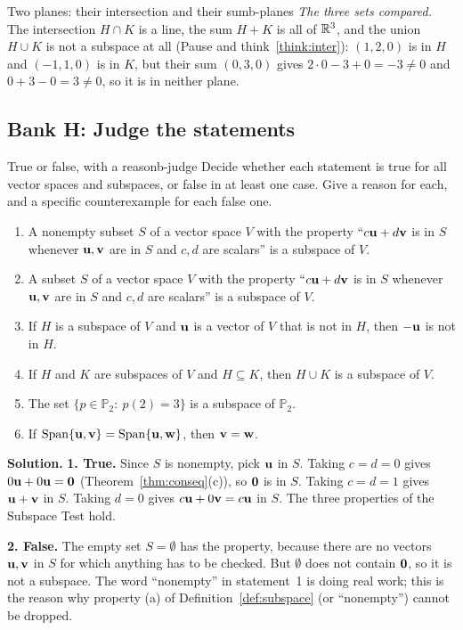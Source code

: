 \documentclass[11pt]{article}
\begin{document}
\begin{exmp}{Two planes: their intersection and their sum}{b-planes}
\emph{The three sets compared.} The intersection $H\cap K$ is a line, the sum $H+K$ is all of $\mathbb{R}^3$, and the union $H\cup K$ is not a subspace at all (Pause and think~\ref{think:inter}): $(1,2,0)$ is in $H$ and $(-1,1,0)$ is in $K$, but their sum $(0,3,0)$ gives $2\cdot0-3+0=-3\neq0$ and $0+3-0=3\neq0$, so it is in neither plane.
\end{exmp}

\subsection*{Bank H: Judge the statements}

\begin{exmp}{True or false, with a reason}{b-judge}
Decide whether each statement is true for all vector spaces and subspaces, or false in at least one case. Give a reason for each, and a specific counterexample for each false one.
\begin{enumerate}
  \item A nonempty subset $S$ of a vector space $V$ with the property ``$c\mathbf{u}+d\mathbf{v}$ is in $S$ whenever $\mathbf{u},\mathbf{v}$ are in $S$ and $c,d$ are scalars'' is a subspace of $V$.
  \item A subset $S$ of a vector space $V$ with the property ``$c\mathbf{u}+d\mathbf{v}$ is in $S$ whenever $\mathbf{u},\mathbf{v}$ are in $S$ and $c,d$ are scalars'' is a subspace of $V$.
  \item If $H$ is a subspace of $V$ and $\mathbf{u}$ is a vector of $V$ that is not in $H$, then $-\mathbf{u}$ is not in $H$.
  \item If $H$ and $K$ are subspaces of $V$ and $H\subseteq K$, then $H\cup K$ is a subspace of $V$.
  \item The set $\{p\in\mathbb{P}_2:\ p(2)=3\}$ is a subspace of $\mathbb{P}_2$.
  \item If $\operatorname{Span}\{\mathbf{u},\mathbf{v}\}=\operatorname{Span}\{\mathbf{u},\mathbf{w}\}$, then $\mathbf{v}=\mathbf{w}$.
\end{enumerate}

\textbf{Solution.} \textbf{1. True.} Since $S$ is nonempty, pick $\mathbf{u}$ in $S$. Taking $c=d=0$ gives $0\mathbf{u}+0\mathbf{u}=\mathbf{0}$ (Theorem~\ref{thm:conseq}(c)), so $\mathbf{0}$ is in $S$. Taking $c=d=1$ gives $\mathbf{u}+\mathbf{v}$ in $S$. Taking $d=0$ gives $c\mathbf{u}+0\mathbf{v}=c\mathbf{u}$ in $S$. The three properties of the Subspace Test hold.

\textbf{2. False.} The empty set $S=\emptyset$ has the property, because there are no vectors $\mathbf{u},\mathbf{v}$ in $S$ for which anything has to be checked. But $\emptyset$ does not contain $\mathbf{0}$, so it is not a subspace. The word ``nonempty'' in statement~1 is doing real work; this is the reason why property (a) of Definition~\ref{def:subspace} (or ``nonempty'') cannot be dropped.


\end{exmp}
\end{document}
